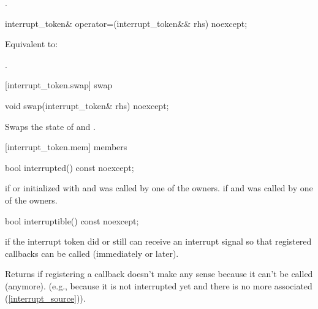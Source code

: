 {\begin{itemdescr}
  \pnum\returns {}.
\end{itemdescr}

%
\begin{itemdecl}
interrupt_token& operator=(interrupt_token&& rhs) noexcept;
\end{itemdecl}
\begin{itemdescr}
  \pnum\effects Equivalent to: 

  \pnum\returns {}.
\end{itemdescr}

[interrupt_token.swap]{ swap}

%
\begin{itemdecl}
void swap(interrupt_token& rhs) noexcept;
\end{itemdecl}

\begin{itemdescr}
\pnum
\effects Swaps the state of  and .
\end{itemdescr}


[interrupt_token.mem]{ members}

%
\begin{itemdecl}
bool interrupted() const noexcept;
\end{itemdecl}
\begin{itemdescr}
  \pnum\returns {} if 
                or initialized with  and  was called
                by one of the owners.
  \pnum\returns {} if  
                and  was called by one of the owners.
\end{itemdescr}

%
\begin{itemdecl}
bool interruptible() const noexcept;
\end{itemdecl}
\begin{itemdescr}
  \pnum\returns {} if the interrupt token did or still can receive an interrupt signal
                so that registered callbacks can be called (immediately or later).
                \begin{note} Returns  if registering a callback
                                doesn't make any sense because it can't be called (anymore).
                                (e.g., because it is not interrupted yet
                                 and there is no more associated 
                                 (\ref{interrupt_source})).
                             \end{note}
\end{itemdescr}


}

